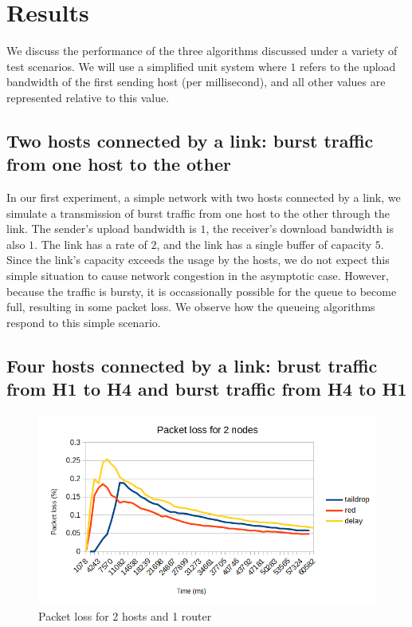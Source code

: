 \documentclass[12pt]{article}
\begin{document}
\section{Results}
We discuss the performance of the three algorithms discussed under a variety of test scenarios. We will use a simplified unit system where $1$ refers to the upload bandwidth of the first sending host (per millisecond), and all other values are represented relative to this value. 

\subsection{Two hosts connected by a link: burst traffic from one host to the other}
In our first experiment, a simple network with two hosts connected by a link, we simulate a transmission of burst traffic from one host to the other through the link. The sender's upload bandwidth is $1$, the receiver's download bandwidth is also $1$. The link has a rate of $2$, and the link has a single buffer of capacity $5$. Since the link's capacity exceeds the usage by the hosts, we do not expect this simple situation to cause network congestion in the asymptotic case. However, because the traffic is bursty, it is occassionally possible for the queue to become full, resulting in some packet loss. We observe how the queueing algorithms respond
to this simple scenario.

\subsection{Four hosts connected by a link: brust traffic from H1 to H4 and burst traffic from H4 to H1}


   \begin{figure}[H]
    \centering
    \includegraphics{figure1.png}
    \centering
    \caption{Packet loss for 2 hosts and 1 router}
\end{figure} 
\end{document}
